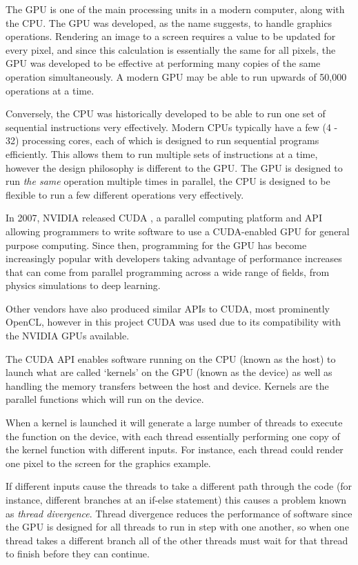 The \acf{GPU} is one of the main processing units in a modern computer, along with the \acf{CPU}.
The \ac{GPU} was developed, as the name suggests, to handle graphics operations.
Rendering an image to a screen requires a value to be updated for every pixel, and since this calculation is essentially the same for all pixels, the \ac{GPU} was developed to be effective at performing many copies of the same operation simultaneously.
A modern \ac{GPU} may be able to run upwards of 50,000 operations at a time.

Conversely, the \ac{CPU} was historically developed to be able to run one set of sequential instructions very effectively.
Modern \acp{CPU} typically have a few (4 - 32) processing cores, each of which is designed to run sequential programs efficiently.
This allows them to run multiple sets of instructions at a time, however the design philosophy is different to the \ac{GPU}.
The \ac{GPU} is designed to run \emph{the same} operation multiple times in parallel, the \ac{CPU} is designed to be flexible to run a few different operations very effectively. 

In 2007, NVIDIA released \ac{CUDA} \cite{Nickolls2008}, a parallel computing platform and \ac{API} allowing programmers to write software to use a \ac{CUDA}-enabled \ac{GPU} for general purpose computing.
Since then, programming for the \ac{GPU} has become increasingly popular with developers taking advantage of performance increases that can come from parallel programming across a wide range of fields, from physics simulations to deep learning. 

Other vendors have also produced similar \acp{API} to \ac{CUDA}, most prominently OpenCL\cite{Stone2010}, however in this project \ac{CUDA} was used due to its compatibility with the NVIDIA \acp{GPU} available.

The \ac{CUDA} \ac{API} enables software running on the \ac{CPU} (known as the host) to launch what are called `kernels' on the \ac{GPU} (known as the device) as well as handling the memory transfers between the host and device. Kernels are the parallel functions which will run on the device.

When a kernel is launched it will generate a large number of threads to execute the function on the device, with each thread essentially performing one copy of the kernel function with different inputs.
For instance, each thread could render one pixel to the screen for the graphics example.

If different inputs cause the threads to take a different path through the code (for instance, different branches at an if-else statement) this causes a problem known as \emph{thread divergence}.
Thread divergence reduces the performance of software since the \ac{GPU} is designed for all threads to run in step with one another, so when one thread takes a different branch all of the other threads must wait for that thread to finish before they can continue. 

